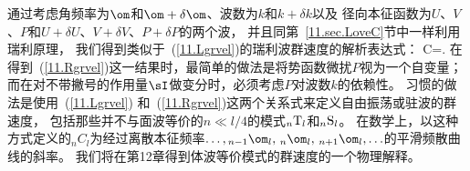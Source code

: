 通过考虑角频率为$\om$和$\om+\delta\om$、波数为$k$和$k+\delta k$以及
径向本征函数为$U$、$V$、$P$和$U+\delta U$、$V+\delta V$、$P+\delta P$的两个波，
并且同第~\ref{11.sec.LoveC}节中一样利用瑞利原理，
我们得到类似于~(\ref{11.Lgrvel})的瑞利波群速度的解析表达式：
%
%
\eq
C=.
\label{11.Rgrvel}
\en
在得到~(\ref{11.Rgrvel})这一结果时，最简单的做法是将势函数微扰$P$视为一个自变量；
而在对不带撇号的作用量$\sI$做变分时，必须考虑$P$对波数$k$的依赖性。
习惯的做法是使用~(\ref{11.Lgrvel}) 和~(\ref{11.Rgrvel})这两个关系式来定义自由振荡或驻波的群速度，
包括那些并不与面波等价的$n\ll l/4$的模式${}_n{\rm T}_l$和${}_n{\rm S}_l$。
在数学上，以这种方式定义的${}_nC_l$为经过离散本征频率$\ldots,{}_{n-1}\om_l,\,{}_n\om_l,\,{}_{n+1}\om_l,\ldots$的平滑频散曲线的斜率。
我们将在第12章得到体波等价模式的群速度的一个物理解释。

